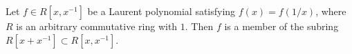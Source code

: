 Let $f \in R[x, x^{-1}]$ be a Laurent polynomial satisfying $f(x) = f(1/x)$, where $R$ is an arbitrary commutative ring with $1$. Then $f$ is a member of the subring $R[x + x^{-1}] \subset R[x, x^{-1}]$.
